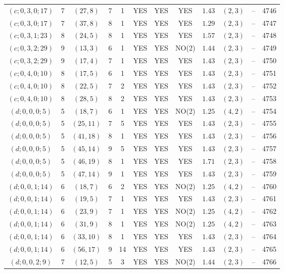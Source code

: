 \begin{longtable}{|c|c|c|c|c|c|c|c|c|c|c|c|}
$(c;0,3,0;17)$ & 7 & $(27,8)$ & 7 & 1 & YES & YES & YES & $1.43$ & $(2,3)$ & -- & 4746\\
$(c;0,3,0;17)$ & 7 & $(37,8)$ & 8 & 1 & YES & YES & YES & $1.29$ & $(2,3)$ & -- & 4747\\
$(c;0,3,1;23)$ & 8 & $(24,5)$ & 8 & 1 & YES & YES & YES & $1.57$ & $(2,3)$ & -- & 4748\\
$(c;0,3,2;29)$ & 9 & $(13,3)$ & 6 & 1 & YES & YES & NO(2) & $1.44$ & $(2,3)$ & -- & 4749\\
$(c;0,3,2;29)$ & 9 & $(17,4)$ & 7 & 1 & YES & YES & YES & $1.43$ & $(2,3)$ & -- & 4750\\
$(c;0,4,0;10)$ & 8 & $(17,5)$ & 6 & 1 & YES & YES & YES & $1.43$ & $(2,3)$ & -- & 4751\\
$(c;0,4,0;10)$ & 8 & $(22,5)$ & 7 & 2 & YES & YES & YES & $1.43$ & $(2,3)$ & -- & 4752\\
$(c;0,4,0;10)$ & 8 & $(28,5)$ & 8 & 2 & YES & YES & YES & $1.43$ & $(2,3)$ & -- & 4753\\
$(d;0,0,0;5)$ & 5 & $(18,7)$ & 6 & 1 & YES & YES & NO(2) & $1.25$ & $(4,2)$ & -- & 4754\\
$(d;0,0,0;5)$ & 5 & $(25,11)$ & 7 & 5 & YES & YES & YES & $1.43$ & $(2,3)$ & -- & 4755\\
$(d;0,0,0;5)$ & 5 & $(41,18)$ & 8 & 1 & YES & YES & YES & $1.43$ & $(2,3)$ & -- & 4756\\
$(d;0,0,0;5)$ & 5 & $(45,14)$ & 9 & 5 & YES & YES & YES & $1.43$ & $(2,3)$ & -- & 4757\\
$(d;0,0,0;5)$ & 5 & $(46,19)$ & 8 & 1 & YES & YES & YES & $1.71$ & $(2,3)$ & -- & 4758\\
$(d;0,0,0;5)$ & 5 & $(47,14)$ & 9 & 1 & YES & YES & YES & $1.43$ & $(2,3)$ & -- & 4759\\
$(d;0,0,1;14)$ & 6 & $(18,7)$ & 6 & 2 & YES & YES & NO(2) & $1.25$ & $(4,2)$ & -- & 4760\\
$(d;0,0,1;14)$ & 6 & $(19,5)$ & 7 & 1 & YES & YES & YES & $1.43$ & $(2,3)$ & -- & 4761\\
$(d;0,0,1;14)$ & 6 & $(23,9)$ & 7 & 1 & YES & YES & NO(2) & $1.25$ & $(4,2)$ & -- & 4762\\
$(d;0,0,1;14)$ & 6 & $(31,9)$ & 8 & 1 & YES & YES & NO(2) & $1.25$ & $(4,2)$ & -- & 4763\\
$(d;0,0,1;14)$ & 6 & $(33,10)$ & 8 & 1 & YES & YES & YES & $1.43$ & $(2,3)$ & -- & 4764\\
$(d;0,0,1;14)$ & 6 & $(56,17)$ & 9 & 14 & YES & YES & YES & $1.43$ & $(2,3)$ & -- & 4765\\
$(d;0,0,2;9)$ & 7 & $(12,5)$ & 5 & 3 & YES & YES & NO(2) & $1.44$ & $(2,3)$ & -- & 4766\\

\end{longtable}
